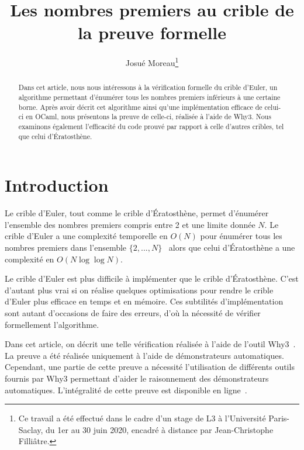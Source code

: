 \documentclass[a4paper]{easychair}
\begin{document}
\title{Les nombres premiers au crible de la preuve formelle}
\author{Josué Moreau\thanks{Ce travail a été effectué dans le cadre
    d'un stage de L3 à l'Université Paris-Saclay, du 1er au 30 juin
    2020, encadré à distance par Jean-Christophe Filliâtre.}}
\maketitle

\begin{abstract}
  Dans cet article, nous nous intéressons à la vérification formelle du
  crible d'Euler, un algorithme permettant d'énumérer tous les nombres
  premiers inférieurs à une certaine borne. Après avoir décrit cet
  algorithme ainsi qu'une implémentation efficace de celui-ci en OCaml,
  nous présentons la preuve de celle-ci, réalisée à l'aide de Why3.
  Nous examinons également l'efficacité du code prouvé par
  rapport à celle d'autres cribles, tel que celui d'Ératosthène.
\end{abstract}

\section{Introduction}

Le crible d'Euler, tout comme le crible d'Ératosthène, permet d'énumérer
l'ensemble des nombres premiers compris entre 2 et une limite donnée $N$.
Le crible d'Euler a une complexité temporelle en $O(N)$ pour énumérer tous les
nombres premiers dans l'ensemble $\{2,...,N\}$~\cite{crible-euler} alors que
celui d'Ératosthène a une complexité en $O(N \log\log N)$.

Le crible d'Euler est plus difficile à implémenter que le crible d'Ératosthène.
C'est d'autant plus vrai si on réalise quelques optimisations pour
rendre le crible d'Euler plus efficace en temps et en mémoire.
Ces subtilités d'implémentation sont autant d'occasions de faire des erreurs,
d'où la nécessité de vérifier formellement l'algorithme.

Dans cet article, on décrit une telle vérification réalisée à l'aide de
l'outil Why3~\cite{why3}.
La preuve a été réalisée uniquement à l'aide de démonstrateurs automatiques.
Cependant, une partie de cette preuve a nécessité l'utilisation de différents
outils fournis par Why3 permettant d'aider le raisonnement des démonstrateurs
automatiques.
L'intégralité de cette preuve est disponible en ligne~\cite{mapreuve}.
\end{document}
